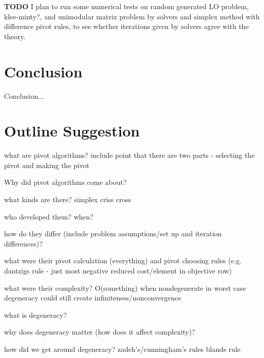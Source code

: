 \documentclass[11pt]{article}
\begin{document}
\textbf{TODO}
I plan to run some numerical tests on random generated LO problem, klee-minty?, and unimodular matrix problem by solvers and simplex method with difference pivot rules, to see whether iterations given by solvers agree with the theory.



\section{Conclusion}
Conclusion...


 

\section{Outline Suggestion}
what are pivot algorithms?
include point that there are two parts - selecting the pivot and making the pivot

Why did pivot algorithms come about?

what kinds are there?
simplex
criss cross

who developed them? when?

how do they differ (include problem assumptions/set up and iteration differences)?

what were their pivot calculation (everything) and pivot choosing rules (e.g. dantzigs rule - just most negative reduced cost/element in objective row)

what were their complexity?
O(something) when nondegenerate in worst case
degeneracy could still create infiniteness/nonconvergence

what is degeneracy?

why does degeneracy matter (how does it affect complexity)?

how did we get around degeneracy?
zadeh's/cunningham's rules
blands rule
\end{document}
